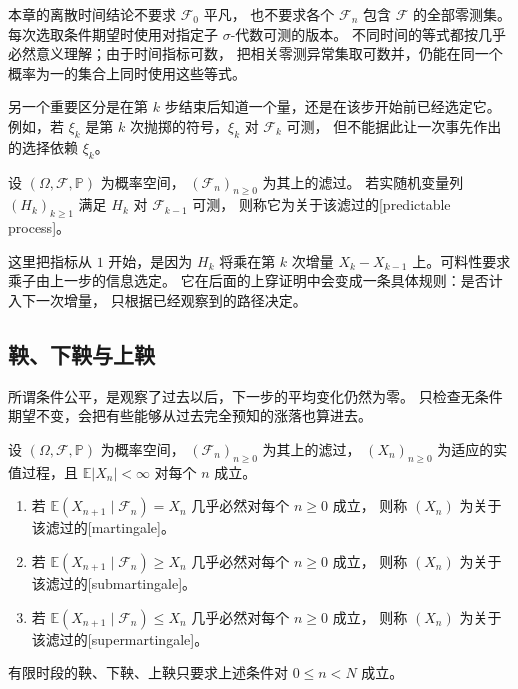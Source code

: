 \ProseParagraphBreak

本章的离散时间结论不要求 \(\mathcal F_0\) 平凡，
也不要求各个 \(\mathcal F_n\) 包含 \(\mathcal F\) 的全部零测集。
每次选取条件期望时使用对指定子 \(\sigma\)-代数可测的版本。
不同时间的等式都按几乎必然意义理解；由于时间指标可数，
把相关零测异常集取可数并，仍能在同一个概率为一的集合上同时使用这些等式。

\ProseParagraphBreak

另一个重要区分是在第 \(k\) 步结束后知道一个量，还是在该步开始前已经选定它。
例如，若 \(\xi_k\) 是第 \(k\) 次抛掷的符号，\(\xi_k\) 对 \(\mathcal F_k\) 可测，
但不能据此让一次事先作出的选择依赖 \(\xi_k\)。

\begin{definition}[离散时间可料过程]
\label{b1:def:predictable-process-31}
设 \((\Omega,\mathcal F,\mathbb P)\) 为概率空间，
\((\mathcal F_n)_{n\geq0}\) 为其上的滤过。
若实随机变量列 \((H_k)_{k\geq1}\) 满足 \(H_k\) 对 \(\mathcal F_{k-1}\) 可测，
则称它为关于该滤过的[predictable process]。
\end{definition}

这里把指标从 \(1\) 开始，是因为 \(H_k\) 将乘在第 \(k\) 次增量
\(X_k-X_{k-1}\) 上。可料性要求乘子由上一步的信息选定。
它在后面的上穿证明中会变成一条具体规则：是否计入下一次增量，
只根据已经观察到的路径决定。

\subsection{鞅、下鞅与上鞅}
\label{b1:subsec:310302}

所谓条件公平，是观察了过去以后，下一步的平均变化仍然为零。
只检查无条件期望不变，会把有些能够从过去完全预知的涨落也算进去。

\begin{definition}
\label{b1:def:martingale-31}
设 \((\Omega,\mathcal F,\mathbb P)\) 为概率空间，
\((\mathcal F_n)_{n\geq0}\) 为其上的滤过，
\((X_n)_{n\geq0}\) 为适应的实值过程，且
\(\mathbb E|X_n|<\infty\) 对每个 \(n\) 成立。
\begin{enumerate}
 \item\label{b1:item:martingale-definition-31}
 若 \(\mathbb E(X_{n+1}\mid\mathcal F_n)=X_n\) 几乎必然对每个 \(n\geq0\) 成立，
 则称 \((X_n)\) 为关于该滤过的[martingale]。
 \item\label{b1:item:submartingale-definition-31}
 若 \(\mathbb E(X_{n+1}\mid\mathcal F_n)\geq X_n\) 几乎必然对每个 \(n\geq0\) 成立，
 则称 \((X_n)\) 为关于该滤过的[submartingale]。
 \item\label{b1:item:supermartingale-definition-31}
 若 \(\mathbb E(X_{n+1}\mid\mathcal F_n)\leq X_n\) 几乎必然对每个 \(n\geq0\) 成立，
 则称 \((X_n)\) 为关于该滤过的[supermartingale]。
\end{enumerate}
有限时段的鞅、下鞅、上鞅只要求上述条件对 \(0\leq n<N\) 成立。
\end{definition}

